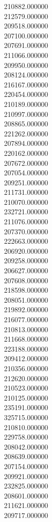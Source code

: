 210882.000000\\
212579.000000\\
209518.000000\\
207100.000000\\
207691.000000\\
211066.000000\\
209950.000000\\
208124.000000\\
216167.000000\\
220454.000000\\
210189.000000\\
210997.000000\\
208865.000000\\
221262.000000\\
207894.000000\\
220162.000000\\
207672.000000\\
207054.000000\\
209251.000000\\
211731.000000\\
210070.000000\\
232721.000000\\
211076.000000\\
207370.000000\\
222663.000000\\
206920.000000\\
209258.000000\\
206627.000000\\
207608.000000\\
218598.000000\\
208051.000000\\
219892.000000\\
216077.000000\\
210813.000000\\
211668.000000\\
223188.000000\\
209412.000000\\
210356.000000\\
212620.000000\\
210523.000000\\
210125.000000\\
235191.000000\\
325715.000000\\
210810.000000\\
229758.000000\\
208042.000000\\
208639.000000\\
207154.000000\\
209921.000000\\
232825.000000\\
208601.000000\\
211621.000000\\
209717.000000\\

